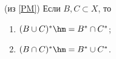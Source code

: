 (из \ref{PM})
        Если $B,C\subset X$, то

        \begin{enumerate}
            \item $(B\cup C)^*\hm=B^*\cap C^*$;

            \item $(B\cap C)^*\hm=B^*\cup C^*$.
        \end{enumerate}
    